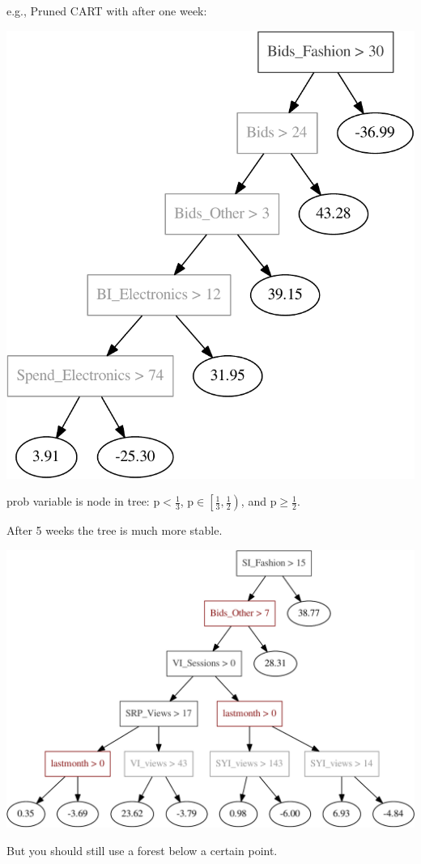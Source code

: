 \documentclass[11pt,xcolor=svgnames]{beamer}
\newcommand{\mr}[1]{\mathrm{#1}}
\begin{document}
\begin{frame}


e.g., Pruned CART with after one week:
\begin{center}
\includegraphics[width=.5\textwidth]{graphs/samptree_week1}
\end{center}
\hfill prob variable is node in tree: {\color{black!50} $\mr{p} <\tfrac{1}{3}$},
{\color{black!75}  $\mr{p} \in
\left[\tfrac{1}{3},\tfrac{1}{2}\right)$}, and {\color{DarkRed}  $\mr{p}
\geq \tfrac{1}{2}$}.
\end{frame}

\begin{frame}

After 5 weeks the tree is much more stable.
\begin{center}
\includegraphics[width=.9\textwidth]{graphs/samptree_week5}
\end{center}

\hfill But you should still use a forest below a certain point.
\end{frame}
 
\end{document}
